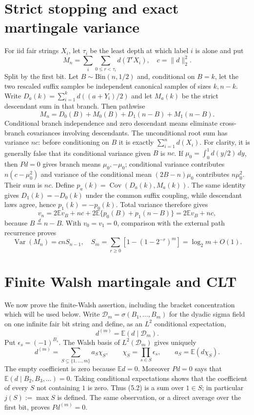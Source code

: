 \documentclass[11pt]{article}
\numberwithin{equation}{section}
\newcommand{\E}{\mathbb E}\newcommand{\Pp}{\mathbb P}
\newcommand{\Var}{\operatorname{Var}}\newcommand{\Cov}{\operatorname{Cov}}
\newcommand{\1}{\mathbf 1}\newcommand{\F}{\mathcal F}\newcommand{\D}{\mathcal D}
\newcommand{\norm}[1]{\lVert#1\rVert}
\begin{document}
\section{Strict stopping and exact martingale variance}
For iid fair strings $X_i$, let $\tau_i$ be the least depth at which label
$i$ is alone and put
\[
 M_n=\sum_i\sum_{0\leq r<\tau_i}d(T^rX_i),\quad c=\norm d_2^2.
\]
Split by the first bit.  Let $B\sim\mathrm{Bin}(n,1/2)$ and, conditional on
$B=k$, let the two rescaled suffix samples be independent canonical samples
of sizes $k,n-k$.  Write $D_a(k)=\sum_{i=1}^kd((a+Y_i)/2)$ and let
$M_a(k)$ be the strict descendant sum in that branch.  Then pathwise
\[
 M_n=D_0(B)+M_0(B)+D_1(n-B)+M_1(n-B).
\]
Conditional branch independence and zero descendant means eliminate cross-branch
covariances involving descendants.  The unconditional root sum has variance
$nc$: before conditioning on $B$ it is exactly $\sum_{i=1}^n d(X_i)$.
For clarity, it is generally false that its conditional variance given $B$ is
$nc$.  If $\mu_0=\int_0^1d(y/2)\,dy$, then $Pd=0$ gives branch means
$\mu_0,-\mu_0$; conditional variance contributes $n(c-\mu_0^2)$ and
variance of the conditional mean $(2B-n)\mu_0$ contributes $n\mu_0^2$.
Their sum is $nc$.  Define
$p_a(k)=\Cov(D_a(k),M_a(k))$.  The same identity gives $D_1(k)=-D_0(k)$ under
the common suffix coupling, while descendant laws agree, hence
$p_1(k)=-p_0(k)$.  Total variance therefore gives
\begin{equation}v_n=2\E v_B+nc+2\E\{p_0(B)+p_1(n-B)\}=2\E v_B+nc,\tag{4.1}\end{equation}
because $B\stackrel d=n-B$.  With $v_0=v_1=0$, comparison with the external
path recurrence proves
\begin{equation}\Var(M_n)=cnS_{n-1},\quad
 S_m=\sum_{r\geq0}[1-(1-2^{-r})^m]=\log_2m+O(1).                \tag{4.2}\end{equation}

\section{Finite Walsh martingale and CLT}\label{sec:walsh-clt}
We now prove the finite-Walsh assertion, including the bracket concentration
which will be used below.  Write
\(
 \mathcal D_m=\sigma(B_1,\ldots,B_m)
\)
for the dyadic sigma field on one infinite fair bit string and define, as an
$L^2$ conditional expectation,
\begin{equation}
 d^{(m)}=\E(d\mid\mathcal D_m).
 \tag{5.1}
\end{equation}
Put $\epsilon_s=(-1)^{B_s}$.  The Walsh basis of $L^2(\mathcal D_m)$ gives
uniquely
\begin{equation}
 d^{(m)}=\sum_{S\subseteq\{1,\ldots,m\}}a_S\chi_S,
 \qquad \chi_S=\prod_{s\in S}\epsilon_s,
 \qquad a_S=\E(d\chi_S).                                    \tag{5.2}
\end{equation}
The empty coefficient is zero because $\E d=0$.  Moreover $Pd=0$ says that
$\E(d\mid B_2,B_3,\ldots)=0$.  Taking conditional expectations shows that
the coefficient of every $S$ not containing $1$ is zero.  Thus (5.2) is a
sum over $1\in S$; in particular $j(S):=\max S$ is defined.  The same
observation, or a direct average over the first bit, proves $Pd^{(m)}=0$.
\end{document}
